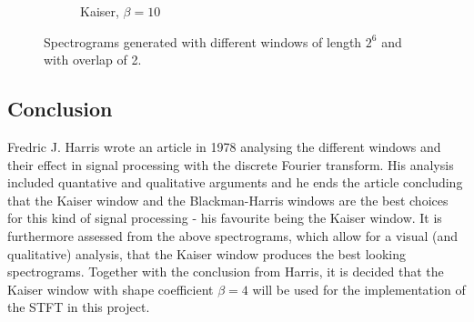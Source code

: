 \begin{figure}[H]
\begin{subfigure}{0.49\textwidth}
\caption{Kaiser, $\beta=10$}
\label{fig:stft_kaiser_100_10}
\end{subfigure}
\caption{Spectrograms generated with different windows of length $2^6$ and with overlap of 2.}
\label{fig:stft_windows_100}
\end{figure}
\subsection{Conclusion}
Fredric J. Harris wrote an article \cite{fredric_harris} in 1978 analysing the different windows and their effect in signal processing with the discrete Fourier transform. His analysis included quantative and qualitative arguments and he ends the article concluding that the Kaiser window and the Blackman-Harris windows are the best choices for this kind of signal processing - his favourite being the Kaiser window. It is furthermore assessed from the above spectrograms, which allow for a visual (and qualitative) analysis, that the Kaiser window produces the best looking spectrograms. Together with the conclusion from Harris, it is decided that the Kaiser window with shape coefficient $\beta = 4$ will be used for the implementation of the STFT in this project.

















